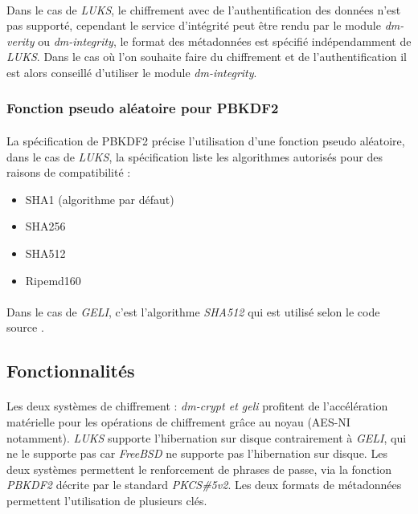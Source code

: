 \paragraph{}
Dans le cas de {\em LUKS}, le chiffrement avec de l'authentification des 
données n'est pas supporté, cependant le service d'intégrité peut être rendu 
par le module {\em dm-verity} ou {\em dm-integrity}, le format des métadonnées 
est spécifié indépendamment de {\em LUKS}. Dans le cas où l'on souhaite faire 
du chiffrement et de l'authentification il est alors conseillé d'utiliser le 
module {\em dm-integrity}.

\subsubsection{Fonction pseudo aléatoire pour PBKDF2}
\paragraph{}
La spécification de PBKDF2 \cite{PKCS5v2} précise l'utilisation d'une fonction
pseudo aléatoire, dans le cas de {\em LUKS}, la spécification 
\cite{onDiskFormatLuks} liste les algorithmes autorisés
pour des raisons de compatibilité :
\begin{itemize}
	\item SHA1 (algorithme par défaut)
	\item SHA256
	\item SHA512
	\item Ripemd160
\end{itemize}
\paragraph{}
Dans le cas de {\em GELI}, c'est l'algorithme {\em SHA512} qui est utilisé
selon le code source \cite{geliPkcs5v2.c}.
\subsection{Fonctionnalités}
\paragraph{}
Les deux systèmes de chiffrement : {\em dm-crypt \em et \em geli} profitent 
de l'accélération matérielle pour les opérations de chiffrement grâce au 
noyau (AES-NI notamment). {\em LUKS} supporte l'hibernation sur disque 
contrairement à {\em GELI}, qui ne le supporte pas car {\em FreeBSD} ne 
supporte pas l'hibernation sur disque. Les deux systèmes permettent le 
renforcement de phrases de passe, via la fonction {\em PBKDF2} décrite 
par le standard {\em PKCS\#5v2}. Les deux formats de métadonnées 
permettent l'utilisation de plusieurs clés.

